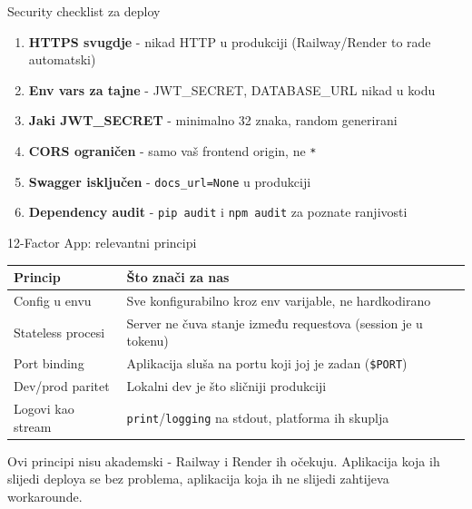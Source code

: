 \begin{frame}{Security checklist za deploy}
\begin{enumerate}
  \item \textbf{HTTPS svugdje} - nikad HTTP u produkciji (Railway/Render to rade automatski)
  \item \textbf{Env vars za tajne} - JWT\_SECRET, DATABASE\_URL nikad u kodu
  \item \textbf{Jaki JWT\_SECRET} - minimalno 32 znaka, random generirani
  \item \textbf{CORS ograničen} - samo vaš frontend origin, ne \texttt{*}
  \item \textbf{Swagger isključen} - \texttt{docs\_url=None} u produkciji
  \item \textbf{Dependency audit} - \texttt{pip audit} i \texttt{npm audit} za poznate ranjivosti
\end{enumerate}
\end{frame}

\begin{frame}{12-Factor App: relevantni principi}
\begin{tabular}{@{}lp{8cm}@{}}
  \toprule
  \textbf{Princip} & \textbf{Što znači za nas} \\
  \midrule
  Config u envu & Sve konfigurabilno kroz env varijable, ne hardkodirano \\
  Stateless procesi & Server ne čuva stanje između requestova (session je u tokenu) \\
  Port binding & Aplikacija sluša na portu koji joj je zadan (\texttt{\$PORT}) \\
  Dev/prod paritet & Lokalni dev je što sličniji produkciji \\
  Logovi kao stream & \texttt{print}/\texttt{logging} na stdout, platforma ih skuplja \\
  \bottomrule
\end{tabular}

\vspace{0.6em}
Ovi principi nisu akademski - Railway i Render ih očekuju. Aplikacija koja ih slijedi deploya se bez problema, aplikacija koja ih ne slijedi zahtijeva workarounde.
\end{frame}

